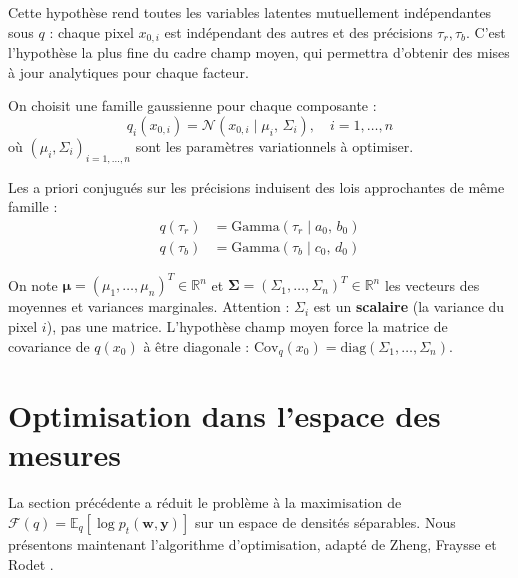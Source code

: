 \documentclass[12pt]{article}
\newcommand{\w}{\boldsymbol{w}}
\newcommand{\y}{\boldsymbol{y}}
\begin{document}
Cette hypothèse rend toutes les variables latentes mutuellement indépendantes sous $q$ : chaque pixel $x_{0,i}$ est indépendant des autres et des précisions $\tau_r, \tau_b$. C'est l'hypothèse la plus fine du cadre champ moyen, qui permettra d'obtenir des mises à jour analytiques pour chaque facteur.

\begin{hypothesebox}
\label{hyp:q_x0}
On choisit une famille gaussienne pour chaque composante :
\begin{equation}
    q_i(x_{0,i}) = \mathcal{N}(x_{0,i} \mid \mu_i,\, \Sigma_i), \quad i = 1, \ldots, n
    \label{eq:q_x0i}
\end{equation}
où $(\mu_i, \Sigma_i)_{i=1,\ldots,n}$ sont les paramètres variationnels à optimiser.
\end{hypothesebox}


\begin{rappelbox}
Les a priori conjugués sur les précisions induisent des lois approchantes de même famille :
\begin{align}
    q(\tau_r) &= \mathrm{Gamma}(\tau_r \mid a_0,\, b_0) \label{eq:q_taur_rappel}\\[4pt]
    q(\tau_b) &= \mathrm{Gamma}(\tau_b \mid c_0,\, d_0) \label{eq:q_taub_rappel}
\end{align}
\end{rappelbox}

\begin{remarkbox}
On note $\boldsymbol{\mu} = (\mu_1, \ldots, \mu_n)^T \in \mathbb{R}^n$ et $\boldsymbol{\Sigma} = (\Sigma_1, \ldots, \Sigma_n)^T \in \mathbb{R}^n$ les vecteurs des moyennes et variances marginales. Attention : $\Sigma_i$ est un \textbf{scalaire} (la variance du pixel $i$), pas une matrice. L'hypothèse champ moyen force la matrice de covariance de $q(x_0)$ à être diagonale : $\mathrm{Cov}_q(x_0) = \mathrm{diag}(\Sigma_1, \ldots, \Sigma_n)$.
\end{remarkbox}

\section{Optimisation dans l'espace des mesures}

La section précédente a réduit le problème à la maximisation de $\mathcal{F}(q) = \mathbb{E}_q[\log p_t(\w, \y)]$ sur un espace de densités séparables. Nous présentons maintenant l'algorithme d'optimisation, adapté de Zheng, Fraysse et Rodet 
\cite{rodet}.
\end{document}

